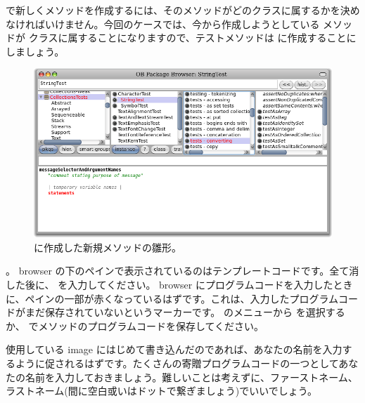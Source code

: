 \documentclass[a4paper,10pt,twoside]{book}
\begin{document}
\pharo で新しくメソッドを作成するには、そのメソッドがどのクラスに属するかを決めなければいけません。今回のケースでは、今から作成しようとしている  メソッドが  クラスに属することになりますので、テストメソッドは  に作成することにしましょう。

\begin{figure}[hbt]
\centerline {\includegraphics[width=\textwidth]{StringTest-newMethodTemplate}}
\caption{ に作成した新規メソッドの雛形。
}
\end{figure}

。
browser の下のペインで表示されているのはテンプレートコードです。全て消した後に、 を入力してください。
browser にプログラムコードを入力したときに、ペインの一部が赤くなっているはずです。これは、入力したプログラムコードがまだ保存されていないというマーカーです。
\actclick のメニューから  を選択するか、 でメソッドのプログラムコードを保存してください。

使用している image にはじめて書き込んだのであれば、あなたの名前を入力するように促されるはずです。たくさんの寄贈プログラムコードの一つとしてあなたの名前を入力しておきましょう。難しいことは考えずに、ファーストネーム、ラストネーム(間に空白或いはドットで繋ぎましょう)でいいでしょう。

\end{document}
